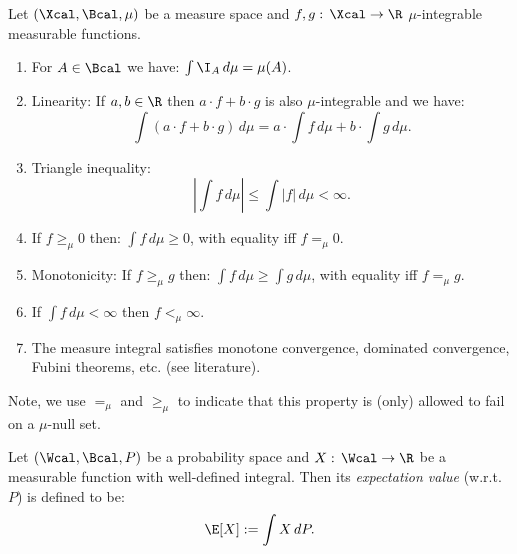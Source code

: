 \begin{Thm}
       Let $(\Xcal,\Bcal,\mu)$ be a measure space and $f,g:\,\Xcal \to \R$ $\mu$-integrable measurable functions.
       \begin{enumerate}
           \item For $A \in \Bcal$ we have: $\int \I_A\,d\mu = \mu(A)$.
           \item Linearity: %
               If $a,b \in \R$ then $a\cdot f+b\cdot g$ is also $\mu$-integrable and we have:
               \[ \int (a\cdot f+b\cdot g)\,d\mu = a\cdot \int f\, d\mu + b \cdot \int g\,d\mu.\]
           \item Triangle inequality: %
               \[\left|\int f\,d\mu\right| \le \int |f|\,d\mu < \infty.\]
           \item %
               If $f \ge_\mu 0$ then: $\int f\,d\mu \ge 0$, with equality iff $f =_\mu 0$.
           \item Monotonicity:  %
               If $f \ge_\mu g$ then: $\int f\,d\mu \ge \int g\,d\mu$, with equality iff $f=_\mu g$.
           \item If $\int f\,d\mu <\infty$ then $f<_\mu \infty$.
           \item The measure integral satisfies monotone convergence, dominated convergence, Fubini theorems, etc.  (see literature).
       \end{enumerate}
       Note, we use $=_\mu$ and $\ge_\mu$ to indicate that this property is (only) allowed to fail on a $\mu$-null set.
\end{Thm}


\begin{Def}
    Let $(\Wcal,\Bcal,P)$ be a probability space and $X:\, \Wcal \to \R$ be a measurable function with well-defined integral.
    Then its \emph{expectation value} (w.r.t.\ $P$) is defined to be:
    \[ \E[X]: = \int X\,dP. \]
\end{Def}

